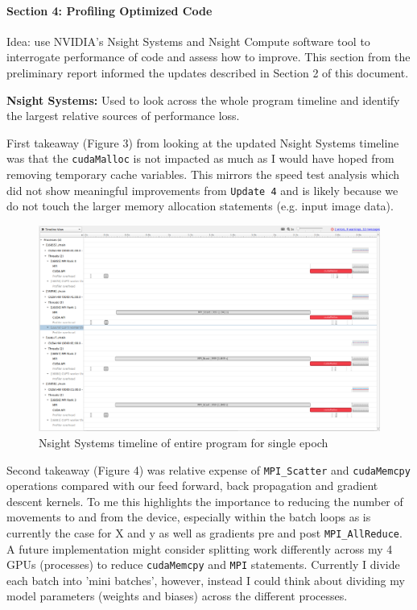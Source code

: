 \documentclass[12pt,letterpaper,twoside]{article}
\begin{document}
\paragraph{Section 4: Profiling Optimized Code} Idea: use NVIDIA's Nsight Systems and Nsight
Compute software tool to interrogate performance of code and assess how to improve. This 
section from the preliminary report informed the updates described in Section 2 of this 
document.

\textbf{Nsight Systems:} Used to look across the whole program timeline and identify the 
largest relative sources of performance loss.

First takeaway (Figure 3) from looking at the updated Nsight Systems timeline was that the 
\texttt{cudaMalloc} is not impacted as much as I would have hoped from removing 
temporary cache variables. This mirrors the speed test analysis which did not show 
meaningful improvements from \texttt{Update 4} and is likely because we do not touch 
the larger memory allocation statements (e.g. input image data). 

\begin{figure}[!htbp]
    \centering
    \includegraphics[scale=0.3]{nsight_systems_overview2.png}
    \caption{Nsight Systems timeline of entire program for single epoch}
\end{figure}

Second takeaway (Figure 4) was relative expense of \texttt{MPI\_Scatter} and \texttt{cudaMemcpy}
operations compared with our feed forward, back propagation and gradient descent kernels.
To me this highlights the importance to reducing the number of movements to and from the 
device, especially within the batch loops as is currently the case for X and y as well 
as gradients pre and post \texttt{MPI\_AllReduce}. A future implementation might consider 
splitting work differently across my 4 GPUs (processes) to reduce \texttt{cudaMemcpy} and 
\texttt{MPI} statements. Currently I divide each batch into 'mini batches', however, 
instead I could think about dividing my model parameters (weights and biases) across 
the different processes. 
\end{document}
